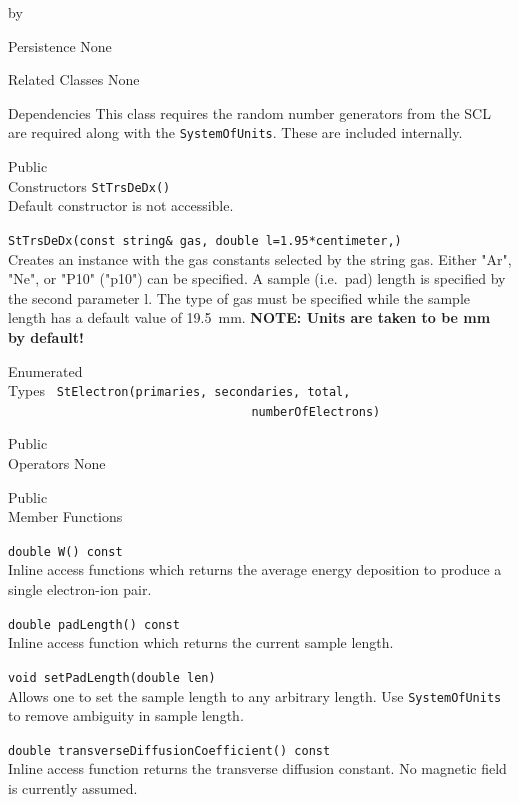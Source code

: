 \documentclass[twoside]{article}
\newcommand{\comp}[1]{\texttt{#1}}%
\newcommand{\entrylabel}[1]{\mbox{\textbf{{#1}}}\hfil}%
\newenvironment{entry}
{\begin{list}{}%
    {\renewcommand{\makelabel}{\entrylabel}%
     \setlength{\labelwidth}{90pt}%
     \setlength{\leftmargin}{\labelwidth}
     \advance\leftmargin by \labelsep%
      }%
    }%
  {\end{list}}
\newcommand{\Entrylabel}[1]%
{\raisebox{0pt}[1ex][0pt]{\makebox[\labelwidth][l]%
    {\parbox[t]{\labelwidth}{\hspace{0pt}\textbf{{#1}}}}}}
\newenvironment{Entry}%
{\renewcommand{\entrylabel}{\Entrylabel}\begin{entry}}%
  {\end{entry}}
\begin{document}
\begin{Entry}
\item[Persistence]
   None

\item[Related Classes]
   None

\item[Dependencies]
  This class requires the random number generators from the 
  SCL are required along with the \comp{SystemOfUnits}.   
  These are included internally.

\item[Public \\ Constructors]
   \verb+StTrsDeDx()+\\
   Default constructor is not accessible.

   \verb+StTrsDeDx(const string& gas, double l=1.95*centimeter,)+\\
   Creates an instance with the gas constants selected by the string
   gas.  Either "Ar", "Ne", or "P10" ("p10") can be specified.
   A sample (i.e.~pad) length is specified by the second parameter l.
   The type of gas must be specified while the sample length has a 
   default value of 19.5~mm.  {\bf NOTE: Units are taken to be mm by
     default!}

\item[Enumerated \\ Types]
   \verb+ StElectron(primaries, secondaries, total,+\\
   \verb+                                  numberOfElectrons)+\\

\item[Public \\ Operators]
   None

\item[Public \\ Member Functions]

  \verb+double W() const+\\
  Inline access functions which returns the average energy deposition
  to produce a single electron-ion pair.

  \verb+double padLength() const+\\
  Inline access function which returns the current sample length.

  \verb+void setPadLength(double len)+\\
  Allows one to set the sample length to any arbitrary length.
  Use \comp{SystemOfUnits} to remove ambiguity in sample length.

  \verb+double transverseDiffusionCoefficient() const+\\
  Inline access function returns the transverse diffusion constant.
  No magnetic field is currently assumed.


\end{Entry}
\end{document}
